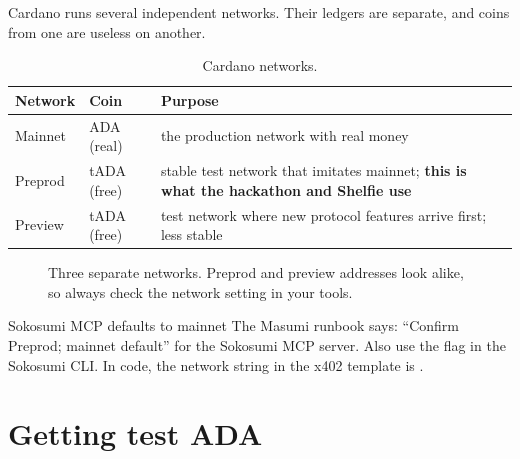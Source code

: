 Cardano runs several independent networks. Their ledgers are separate, and coins from one are useless on another.

\begin{table}[h]
\centering
\small
\begin{tabular}{@{}p{2.6cm}p{3.3cm}p{8.4cm}@{}}
\toprule
\textbf{Network} & \textbf{Coin} & \textbf{Purpose}\\
\midrule
Mainnet & ADA (real) & the production network with real money\\
Preprod & tADA (free) & stable test network that imitates mainnet; \textbf{this is what the hackathon and Shelfie use}\\
Preview & tADA (free) & test network where new protocol features arrive first; less stable\\
\bottomrule
\end{tabular}
\caption{Cardano networks.}
\end{table}

\begin{figure}[h]
\centering
{}
\caption{Three separate networks. Preprod and preview addresses look alike, so always check the network setting in your tools.}
\end{figure}

\begin{warningbox}{Sokosumi MCP defaults to mainnet}
The Masumi runbook says: ``Confirm Preprod; mainnet default'' for the Sokosumi MCP server. Also use the  flag in the Sokosumi CLI. In code, the network string in the x402 template is .
\end{warningbox}

\section{Getting test ADA}


